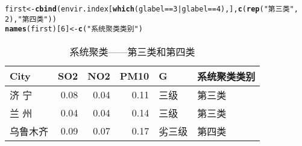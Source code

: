 \documentclass[12pt,oneside]{report}\usepackage{graphicx, color}
\makeatletter
\newcommand{\hlfunctioncall}[1]{\textcolor[rgb]{0.501960784313725,0,0.329411764705882}{\textbf{#1}}}%
\newcommand{\hlstring}[1]{\textcolor[rgb]{0.6,0.6,1}{#1}}%
\newenvironment{kframe}{%
 \def\at@end@of@kframe{}%
 \ifinner\ifhmode%
  \def\at@end@of@kframe{\end{minipage}}%
  \begin{minipage}{\columnwidth}%
 \fi\fi%
 \def\FrameCommand##1{\hskip\@totalleftmargin \hskip-\fboxsep
 \colorbox{shadecolor}{##1}\hskip-\fboxsep
     \hskip-\linewidth \hskip-\@totalleftmargin \hskip\columnwidth}%
 \MakeFramed {\advance\hsize-\width
   \@totalleftmargin\z@ \linewidth\hsize
   \@setminipage}}%
 {\par\unskip\endMakeFramed%
 \at@end@of@kframe}
\newenvironment{knitrout}{}{} %
\makeatother
\begin{document}
\begin{knitrout}
\color{fgcolor}\begin{kframe}
\begin{alltt}
first <- \hlfunctioncall{cbind}(envir.index[\hlfunctioncall{which}(glabel == 3 | glabel == 4), ], \hlfunctioncall{c}(\hlfunctioncall{rep}(\hlstring{"第三类"}, 
    2), \hlstring{"第四类"}))
\hlfunctioncall{names}(first)[6] <- \hlfunctioncall{c}(\hlstring{"系统聚类类别"})
\end{alltt}
\end{kframe}
\end{knitrout}

\begin{table}[ht]
\begin{center}
\begin{tabular}{lrrrll}
  \hline
City & SO2 & NO2 & PM10 & G & 系统聚类类别 \\ 
  \hline
济 宁 & 0.08 & 0.04 & 0.11 & 三级 & 第三类 \\ 
  兰 州 & 0.04 & 0.04 & 0.14 & 三级 & 第三类 \\ 
  乌鲁木齐 & 0.09 & 0.07 & 0.17 & 劣三级 & 第四类 \\ 
   \hline
\end{tabular}
\caption{系统聚类——第三类和第四类}
\end{center}
\end{table}

          
\end{document}

